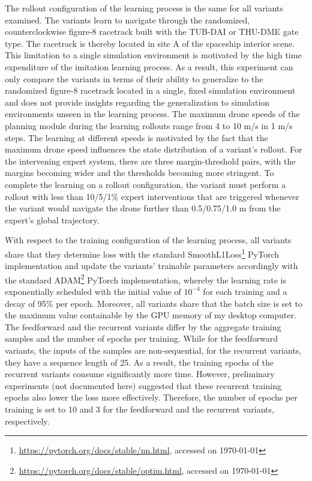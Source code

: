The rollout configuration of the learning process
is the same for all variants examined.
The variants learn to navigate through 
the randomized, counterclockwise figure-8 racetrack
built with the TUB-DAI or THU-DME gate type.
The racetrack is thereby located in
site A of the spaceship interior scene.
This limitation to a single simulation environment
is motivated by the 
high time expenditure of the imitation learning process.
As a result,
this experiment can only compare the variants 
in terms of their ability to generalize 
to the randomized figure-8 racetrack
located in a single, fixed simulation environment
and does not provide insights 
regarding the generalization to simulation environments 
unseen in the learning process.
The maximum drone speeds of the planning module
during the learning rollouts
range from 4 to 10 m/s in 1 m/s steps.
The learning at different speeds is motivated
by the fact that the maximum drone speed 
influences the state distribution of a variant's rollout.
For the intervening expert system, 
there are three margin-threshold pairs, 
with the margins becoming wider 
and the thresholds becoming more stringent.
To complete the learning on a rollout configuration,
the variant must perform a rollout 
with less than 10/5/1\% expert interventions
that are triggered whenever the variant
would navigate the drone further than 0.5/0.75/1.0 m
from the expert's global trajectory.

With respect to the training configuration of the learning process,
all variants share that they 
determine loss with
the standard 
SmoothL1Loss\footnote{\url{https://pytorch.org/docs/stable/nn.html}, accessed on \today}
PyTorch implementation
and update the variants' trainable parameters accordingly 
with the standard 
ADAM\footnote{\url{https://pytorch.org/docs/stable/optim.html}, accessed on \today}
PyTorch implementation,
whereby the learning rate is exponentially scheduled
with the initial value of $10^{-4}$ for each training and a decay of 
95\% per epoch.
Moreover, all variants share that the batch size 
is set to the maximum value containable by
the GPU memory of my desktop computer.
The feedforward and the recurrent variants differ 
by the aggregate training samples
and the number of epochs per training.
While for the feedforward variants,
the inputs of the samples are non-sequential,
for the recurrent variants,
they have a sequence length of 25.
As a result, the training epochs of the
recurrent variants consume significantly more time.
However, preliminary experiments 
(not documented here)
suggested that these recurrent training epochs 
also lower the loss more effectively.
Therefore, the number of epochs per training
is set to 10 and 3 for the feedforward
and the recurrent variants, respectively.

